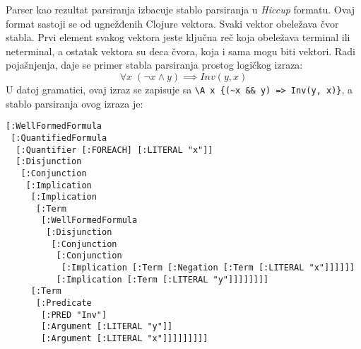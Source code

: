Parser kao rezultat parsiranja izbacuje stablo parsiranja u \textit{Hiccup} formatu. Ovaj format sastoji se od ugnežđenih Clojure vektora. Svaki vektor obeležava čvor stabla. Prvi element svakog vektora jeste ključna reč koja obeležava terminal ili neterminal, a ostatak vektora su deca čvora, koja i sama mogu biti vektori. Radi pojašnjenja, daje se primer stabla parsiranja prostog logičkog izraza:
\begin{equation}
\label{eq:logic}
\forall x \; (\neg x \land y) \implies \mathit{Inv}(y, x)
\end{equation}
U datoj gramatici, ovaj izraz se zapisuje sa \verb|\A x {(~x && y) => Inv(y, x)}|, a stablo parsiranja ovog izraza je:
\begin{verbatim}
[:WellFormedFormula
 [:QuantifiedFormula
  [:Quantifier [:FOREACH] [:LITERAL "x"]]
  [:Disjunction
   [:Conjunction
    [:Implication
     [:Implication
      [:Term
       [:WellFormedFormula
        [:Disjunction
         [:Conjunction
          [:Conjunction
           [:Implication [:Term [:Negation [:Term [:LITERAL "x"]]]]]]
          [:Implication [:Term [:LITERAL "y"]]]]]]]]
     [:Term
      [:Predicate
       [:PRED "Inv"]
       [:Argument [:LITERAL "y"]]
       [:Argument [:LITERAL "x"]]]]]]]]]
\end{verbatim}
